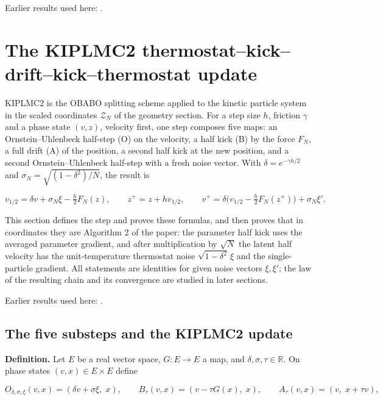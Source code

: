 \documentclass[11pt,a4paper]{report}
\begin{document}
Earlier results used here: \cite[Section~3.1.1]{LangevinLean2026IPLA}.
\section{\texorpdfstring{The KIPLMC2 thermostat–kick–drift–kick–thermostat update}{The KIPLMC2 thermostat–kick–drift–kick–thermostat update}}
\label{proof-module-KIPLMC-Splitting-lean}


KIPLMC2 is the OBABO splitting scheme applied to the kinetic particle system in the scaled coordinates \(\mathcal Z_N\) of the geometry section. For a step size \(h\), friction \(\gamma\) and a phase state \((v,z)\), velocity first, one step composes five maps: an Ornstein–Uhlenbeck half-step (O) on the velocity, a half kick (B) by the force \(F_N\), a full drift (A) of the position, a second half kick at the new position, and a second Ornstein–Uhlenbeck half-step with a fresh noise vector. With \(\delta=e^{-\gamma h/2}\) and \(\sigma_N=\sqrt{(1-\delta^2)/N}\), the result is


\[v_{1/2}=\delta v+\sigma_N\xi-\tfrac h2F_N(z),\qquad z^+=z+hv_{1/2},\qquad v^+=\delta\bigl(v_{1/2}-\tfrac h2F_N(z^+)\bigr)+\sigma_N\xi'.\]


This section defines the step and proves these formulas, and then proves that in coordinates they are Algorithm 2 of the paper: the parameter half kick uses the averaged parameter gradient, and after multiplication by \(\sqrt N\) the latent half velocity has the unit-temperature thermostat noise \(\sqrt{1-\delta^2}\,\xi\) and the single-particle gradient. All statements are identities for given noise vectors \(\xi,\xi'\); the law of the resulting chain and its convergence are studied in later sections.



Earlier results used here: \cite[Section~3.20]{LangevinLean2026Kinetic}.
\subsection{\texorpdfstring{The five substeps and the KIPLMC2 update}{The five substeps and the KIPLMC2 update}}
\label{report-step-KIPLMC-Splitting-lean-1}


\textbf{Definition.} Let \(E\) be a real vector space, \(G:E\to E\) a map, and \(\delta,\sigma,\tau\in\mathbb R\). On phase states \((v,x)\in E\times E\) define


\[O_{\delta,\sigma,\xi}(v,x)=(\delta v+\sigma\xi,\;x),\qquad B_\tau(v,x)=(v-\tau G(x),\;x),\qquad A_\tau(v,x)=(v,\;x+\tau v),\]
\end{document}
